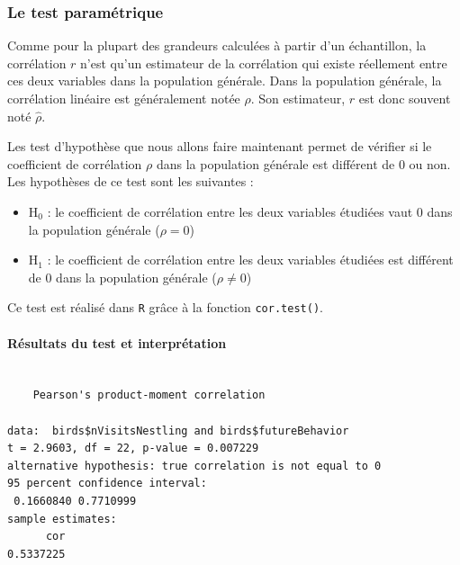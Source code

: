 \documentclass[a4paperpaper,]{article}
\newenvironment{Shaded}{\begin{snugshade}}{\end{snugshade}}
\newcommand{\KeywordTok}[1]{\textcolor[rgb]{0.12,0.11,0.11}{\textbf{#1}}}
\newcommand{\NormalTok}[1]{\textcolor[rgb]{0.12,0.11,0.11}{#1}}
\newcommand{\OperatorTok}[1]{\textcolor[rgb]{0.12,0.11,0.11}{#1}}
\providecommand{\tightlist}{%
  \setlength{\itemsep}{0pt}\setlength{\parskip}{0pt}}
\let\oldparagraph\paragraph
\renewcommand{\paragraph}[1]{\oldparagraph{#1}\mbox{}}
\begin{document}
\hypertarget{le-test-parametrique-4}{%
\subsubsection{Le test paramétrique}\label{le-test-parametrique-4}}

Comme pour la plupart des grandeurs calculées à partir d'un échantillon, la corrélation \(r\) n'est qu'un estimateur de la corrélation qui existe réellement entre ces deux variables dans la population générale. Dans la population générale, la corrélation linéaire est généralement notée \(\rho\). Son estimateur, \(r\) est donc souvent noté \(\hat{\rho}\).

Les test d'hypothèse que nous allons faire maintenant permet de vérifier si le coefficient de corrélation \(\rho\) dans la population générale est différent de 0 ou non. Les hypothèses de ce test sont les suivantes :

\begin{itemize}
\tightlist
\item
  H\(_0\) : le coefficient de corrélation entre les deux variables étudiées vaut 0 dans la population générale (\(\rho = 0\))
\item
  H\(_1\) : le coefficient de corrélation entre les deux variables étudiées est différent de 0 dans la population générale (\(\rho \neq 0\))
\end{itemize}

Ce test est réalisé dans \texttt{R} grâce à la fonction \texttt{cor.test()}.

\hypertarget{resultats-du-test-et-interpretation}{%
\paragraph{Résultats du test et interprétation}\label{resultats-du-test-et-interpretation}}

\begin{Shaded}
\end{Shaded}

\begin{verbatim}

    Pearson's product-moment correlation

data:  birds$nVisitsNestling and birds$futureBehavior
t = 2.9603, df = 22, p-value = 0.007229
alternative hypothesis: true correlation is not equal to 0
95 percent confidence interval:
 0.1660840 0.7710999
sample estimates:
      cor 
0.5337225 
\end{verbatim}
\end{document}
